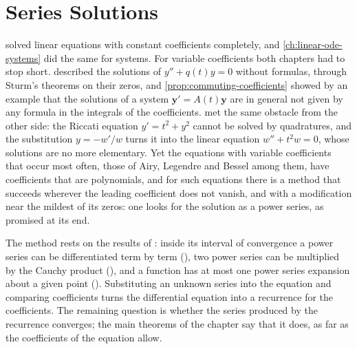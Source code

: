 \chapter{Series Solutions}
\label{ch:series-solutions}


 solved linear equations with constant coefficients completely, and \cref{ch:linear-ode-systems} did the same for systems. For variable coefficients both chapters had to stop short.  described the solutions of $y''+q(t)y=0$ without formulas, through Sturm's theorems on their zeros, and \cref{prop:commuting-coefficients} showed by an example that the solutions of a system $\mathbf y'=A(t)\mathbf y$ are in general not given by any formula in the integrals of the coefficients.  met the same obstacle from the other side: the Riccati equation $y'=t^2+y^2$ cannot be solved by quadratures, and the substitution $y=-w'/w$ turns it into the linear equation $w''+t^2w=0$, whose solutions are no more elementary. Yet the equations with variable coefficients that occur most often, those of Airy, Legendre and Bessel among them, have coefficients that are polynomials, and for such equations there is a method that succeeds wherever the leading coefficient does not vanish, and with a modification near the mildest of its zeros: one looks for the solution as a power series, as  promised at its end.

The method rests on the results of : inside its interval of convergence a power series can be differentiated term by term (), two power series can be multiplied by the Cauchy product (), and a function has at most one power series expansion about a given point (). Substituting an unknown series into the equation and comparing coefficients turns the differential equation into a recurrence for the coefficients. The remaining question is whether the series produced by the recurrence converges; the main theorems of the chapter say that it does, as far as the coefficients of the equation allow.

